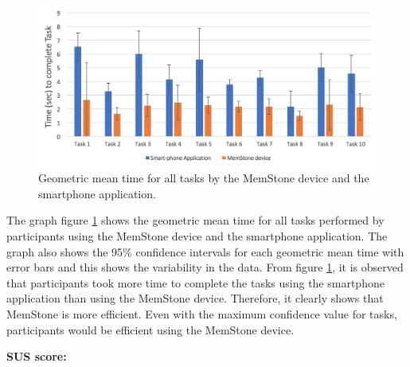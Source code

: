 \documentclass[mscthesis]{usiinfthesis}
\begin{document}
\begin{figure}[!ht]
  \centering
  \includegraphics[width=1\textwidth]{ttm}
  \caption{Geometric mean time for all tasks by the MemStone device and the smartphone application.}
  \label{fig23}
\end{figure}

The graph figure \ref{fig23} shows the geometric mean time for all tasks performed by participants using the MemStone device and the smartphone application. The graph also shows the 95\% confidence intervals for each geometric mean time with error bars and this shows the variability in the data. From figure \ref{fig23}, it is observed that participants took more time to complete the tasks using the smartphone application than using the MemStone device. Therefore, it clearly shows that MemStone is more efficient. Even with the maximum confidence value for tasks, participants would be efficient using the MemStone device.
\newline
\newline

\textbf{SUS score:}
\end{document}
